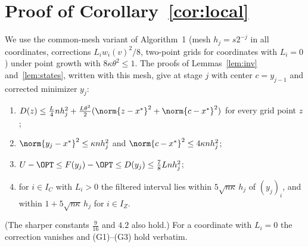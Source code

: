\section{Proof of Corollary~\ref{cor:local}}\label{app:localized}
We use the common-mesh variant of Algorithm~1 (mesh $h_j=s2^{-j}$ in all
coordinates, corrections $L_iw_i(v)^2/8$, two-point grids for coordinates with
$L_i=0$) under point growth with $8\kappa\theta^2\le1$. The proofs of
Lemmas~\ref{lem:inv} and~\ref{lem:states}, written with this mesh, give at stage
$j$ with center $c=y_{j-1}$ and corrected minimizer $y_j$:
\begin{enumerate}[label=(G\arabic*)]
\item $D(z)\le\frac L4nh_j^2+\frac{L\theta^2}2(\norm{z-x^*}^2+\norm{c-x^*}^2)$ for
every grid point $z$;
\item $\norm{y_j-x^*}^2\le\kappa nh_j^2$ and $\norm{c-x^*}^2\le4\kappa nh_j^2$;
\item $U-\OPT\le F(y_j)-\OPT\le D(y_j)\le\frac78Lnh_j^2$;
\item for $i\in I_C$ with $L_i>0$ the filtered interval lies within
$5\sqrt{n\kappa}\,h_j$ of $(y_j)_i$, and within $1+5\sqrt{n\kappa}\,h_j$ for
$i\in I_Z$.
\end{enumerate}
(The sharper constants $\frac9{16}$ and $4.2$ also hold.) For a coordinate with
$L_i=0$ the correction vanishes and (G1)--(G3) hold verbatim.

